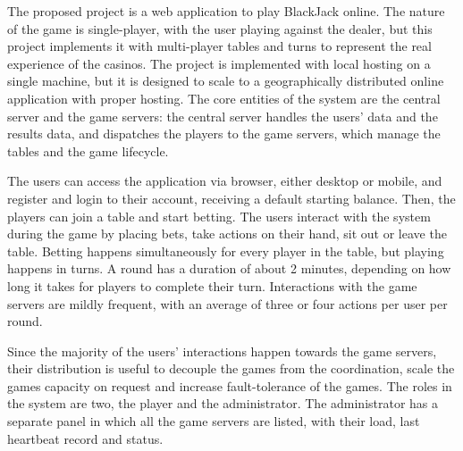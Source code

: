 \documentclass{scrartcl}
\newcommand{\NOTE}[1]{\todo[color=green!20, inline]{#1}}
\begin{document}
The proposed project is a web application to play BlackJack online.
The nature of the game is single-player, with the user playing against the dealer, but this project implements it with multi-player tables and turns to represent the real experience of the casinos.
The project is implemented with local hosting on a single machine, but it is designed to scale to a geographically distributed online application with proper hosting.
The core entities of the system are the central server and the game servers: the central server handles the users' data and the results data, and dispatches the players to the game servers, which manage the tables and the game lifecycle.

The users can access the application via browser, either desktop or mobile, and register and login to their account, receiving a default starting balance.
Then, the players can join a table and start betting.
The users interact with the system during the game by placing bets, take actions on their hand, sit out or leave the table.
Betting happens simultaneously for every player in the table, but playing happens in turns.
A round has a duration of about 2 minutes, depending on how long it takes for players to complete their turn.
Interactions with the game servers are mildly frequent, with an average of three or four actions per user per round.

Since the majority of the users' interactions happen towards the game servers, their distribution is useful to decouple the games from the coordination, scale the games capacity on request and increase fault-tolerance of the games.
The roles in the system are two, the player and the administrator. 
The administrator has a separate panel in which all the game servers are listed, with their load, last heartbeat record and status.



\end{document}
